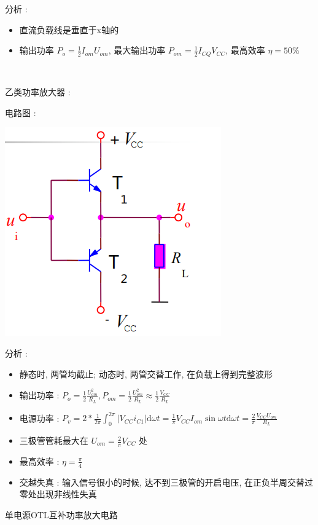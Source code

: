 \documentclass[UTF8, 12pt]{ctexart}
\begin{document}
	分析 :
	\begin{itemize}[leftmargin = 4em]
		\item 直流负载线是垂直于x轴的
		\item 输出功率 $ P_{o} = \frac{1}{2}I_{om}U_{om} $, 最大输出功率 $ P_{om} = \frac{1}{2}I_{CQ}V_{CC} $, 最高效率 $ \eta = 50\% $
	\end{itemize}

	~

	\noindent
	乙类功率放大器 :

	电路图 :

	\includegraphics[scale = 0.4]{04/乙类功率放大电路电路图.png}

	分析 :
	\begin{itemize}[leftmargin = 4em]
		\item 静态时, 两管均截止; 动态时, 两管交替工作, 在负载上得到完整波形
		\item 输出功率 : $ P_{o} = \frac{1}{2}\frac{U_{om}^{2}}{R_{L}}, P_{om} = \frac{1}{2}\frac{U_{om}^{2}}{R_{L}} \approx \frac{1}{2}\frac{V_{CC}}{R_{L}} $
		\item 电源功率 : $ P_{v} = 2*\frac{1}{2\pi} \int_{0}^{2\pi}|V_{CC}i_{C1}|\mathrm{d}\omega t = \frac{1}{\pi}V_{CC}I_{om}\sin\omega t\mathrm{d}\omega t = \frac{2}{\pi}\frac{V_{CC}U_{om}}{R_{L}} $
		\item 三极管管耗最大在 $ U_{om} = \frac{2}{\pi}V_{CC} $ 处
		\item 最高效率 : $ \eta = \frac{\pi}{4} $
		\item 交越失真 : 输入信号很小的时候, 达不到三极管的开启电压, 在正负半周交替过零处出现非线性失真
	\end{itemize}

	单电源OTL互补功率放大电路
\end{document}

